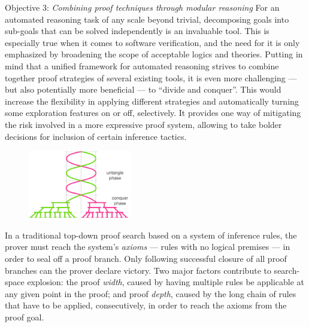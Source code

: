 \begin{paragraph}{Objective 3: {\it Combining proof techniques through modular reasoning}}
For an automated reasoning task of any scale beyond trivial, decomposing goals into sub-goals that can be solved independently is an invaluable tool.
This is especially true when it comes to software verification, and the need for it is only emphasized by broadening the scope of acceptable logics and theories.
Putting in mind that a unified framework for automated reasoning strives to combine together proof strategies of several existing tools,
it is even more challenging --- but also potentially more beneficial --- to ``divide and conquer''.
This would increase the flexibility in applying different strategies and automatically turning some exploration features on or off, selectively.
It provides one way of mitigating the risk involved in a more expressive proof system, allowing to take bolder decisions for inclusion of certain inference tactics.

\begin{figure}
\vspace{-1em}
\includegraphics[width=4.5cm]{img/untangled}
\end{figure}

In a traditional top-down proof search based on a system of inference rules, the prover must reach the system's \emph{axioms} --- rules with no logical premises ---
in order to seal off a proof branch.
Only following successful closure of all proof branches can the prover declare victory.
Two major factors contribute to search-space explosion:
the proof \emph{width}, caused by having multiple rules be applicable at any given point in the proof;
and proof \emph{depth}, caused by the long chain of rules that have to be applied, consecutively, in order to reach the axioms from the proof goal.


\end{paragraph}
